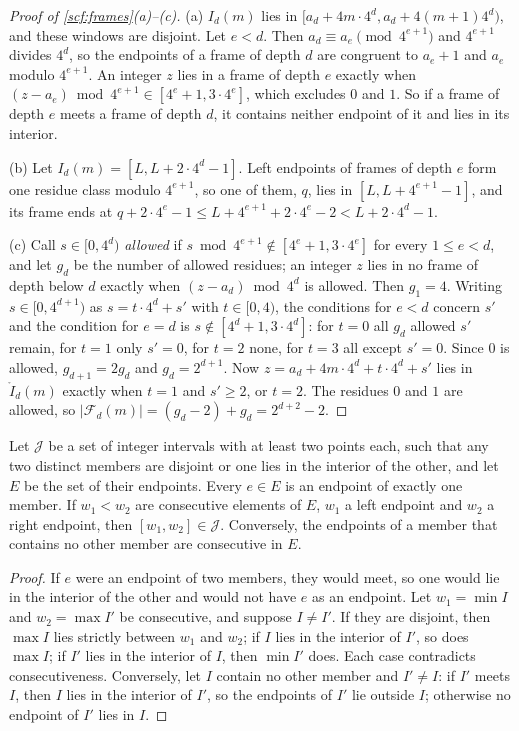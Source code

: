 \begin{proof}[Proof of \cref{scf:frames}(a)--(c)]
(a) $I_d(m)$ lies in $[a_d+4m\cdot4^d,a_d+4(m+1)4^d)$, and these windows are disjoint. Let $e<d$. Then $a_d\equiv a_e\pmod{4^{e+1}}$ and $4^{e+1}$ divides $4^d$, so the endpoints of a frame of depth $d$ are congruent to $a_e+1$ and $a_e$ modulo $4^{e+1}$. An integer $z$ lies in a frame of depth $e$ exactly when $(z-a_e)\bmod4^{e+1}\in[4^e+1,3\cdot4^e]$, which excludes $0$ and $1$. So if a frame of depth $e$ meets a frame of depth $d$, it contains neither endpoint of it and lies in its interior.

(b) Let $I_d(m)=[L,L+2\cdot4^d-1]$. Left endpoints of frames of depth $e$ form one residue class modulo $4^{e+1}$, so one of them, $q$, lies in $[L,L+4^{e+1}-1]$, and its frame ends at $q+2\cdot4^e-1\le L+4^{e+1}+2\cdot4^e-2<L+2\cdot4^d-1$.

(c) Call $s\in[0,4^d)$ \emph{allowed} if $s\bmod4^{e+1}\notin[4^e+1,3\cdot4^e]$ for every $1\le e<d$, and let $g_d$ be the number of allowed residues; an integer $z$ lies in no frame of depth below $d$ exactly when $(z-a_d)\bmod4^d$ is allowed. Then $g_1=4$. Writing $s\in[0,4^{d+1})$ as $s=t\cdot4^d+s'$ with $t\in[0,4)$, the conditions for $e<d$ concern $s'$ and the condition for $e=d$ is $s\notin[4^d+1,3\cdot4^d]$: for $t=0$ all $g_d$ allowed $s'$ remain, for $t=1$ only $s'=0$, for $t=2$ none, for $t=3$ all except $s'=0$. Since $0$ is allowed, $g_{d+1}=2g_d$ and $g_d=2^{d+1}$. Now $z=a_d+4m\cdot4^d+t\cdot4^d+s'$ lies in $\mathring I_d(m)$ exactly when $t=1$ and $s'\ge2$, or $t=2$. The residues $0$ and $1$ are allowed, so $|\mathcal F_d(m)|=(g_d-2)+g_d=2^{d+2}-2$.
\end{proof}

\begin{lemma}\label{app:laminar}
Let $\mathcal J$ be a set of integer intervals with at least two points each, such that any two distinct members are disjoint or one lies in the interior of the other, and let $E$ be the set of their endpoints. Every $e\in E$ is an endpoint of exactly one member. If $w_1<w_2$ are consecutive elements of $E$, $w_1$ a left endpoint and $w_2$ a right endpoint, then $[w_1,w_2]\in\mathcal J$. Conversely, the endpoints of a member that contains no other member are consecutive in $E$.
\end{lemma}

\begin{proof}
If $e$ were an endpoint of two members, they would meet, so one would lie in the interior of the other and would not have $e$ as an endpoint. Let $w_1=\min I$ and $w_2=\max I'$ be consecutive, and suppose $I\ne I'$. If they are disjoint, then $\max I$ lies strictly between $w_1$ and $w_2$; if $I$ lies in the interior of $I'$, so does $\max I$; if $I'$ lies in the interior of $I$, then $\min I'$ does. Each case contradicts consecutiveness. Conversely, let $I$ contain no other member and $I'\ne I$: if $I'$ meets $I$, then $I$ lies in the interior of $I'$, so the endpoints of $I'$ lie outside $I$; otherwise no endpoint of $I'$ lies in $I$.
\end{proof}
